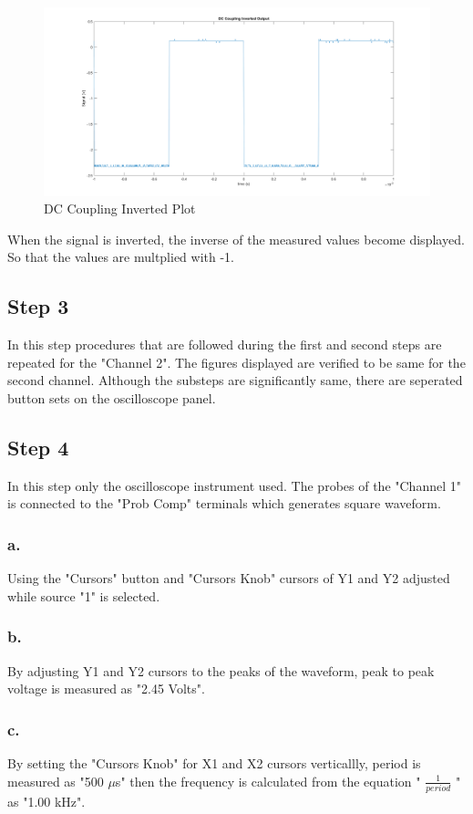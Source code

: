 \documentclass[letterpaper,12pt]{article}
\begin{document}
\begin{figure}[h]
	\caption{DC Coupling Inverted Plot}
	\centering
	\includegraphics[width=1\textwidth]{2b2.png}
\end{figure}
When the signal is inverted, the inverse of the measured values become displayed. So that the values are multplied with -1. 

\subsection{Step 3}
In this step procedures that are followed during the first and second steps are repeated for the "Channel 2". The figures displayed are verified to be same for the second channel. Although the substeps are significantly same, there are seperated button sets on the oscilloscope panel.
\subsection{Step 4}
In this step only the oscilloscope instrument used. The probes of the "Channel 1" is connected to the "Prob Comp" terminals which generates square waveform.
\subsubsection{a.}
Using the "Cursors" button and "Cursors Knob" cursors of Y1 and Y2 adjusted while source "1" is selected.
\subsubsection{b.}
By adjusting Y1 and Y2 cursors to the peaks of the waveform, peak to peak voltage is measured as "2.45 Volts".
\subsubsection{c.}
By setting the "Cursors Knob" for X1 and X2 cursors verticallly, period is measured as "500 \(\mu\)s" then the frequency is calculated from the equation "  \( \frac{1}{period} \) " as "1.00 kHz".
\end{document}
